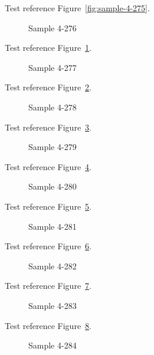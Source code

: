 Test reference Figure~\ref{fig:sample-4-275}.

\begin{figure}[tbhp]
\caption{Sample 4-276}
\label{fig:sample-4-276}
\end{figure}

Test reference Figure~\ref{fig:sample-4-276}.

\begin{figure}[tbhp]
\caption{Sample 4-277}
\label{fig:sample-4-277}
\end{figure}

Test reference Figure~\ref{fig:sample-4-277}.

\begin{figure}[tbhp]
\caption{Sample 4-278}
\label{fig:sample-4-278}
\end{figure}

Test reference Figure~\ref{fig:sample-4-278}.

\begin{figure}[tbhp]
\caption{Sample 4-279}
\label{fig:sample-4-279}
\end{figure}

Test reference Figure~\ref{fig:sample-4-279}.

\begin{figure}[tbhp]
\caption{Sample 4-280}
\label{fig:sample-4-280}
\end{figure}

Test reference Figure~\ref{fig:sample-4-280}.

\begin{figure}[tbhp]
\caption{Sample 4-281}
\label{fig:sample-4-281}
\end{figure}

Test reference Figure~\ref{fig:sample-4-281}.

\begin{figure}[tbhp]
\caption{Sample 4-282}
\label{fig:sample-4-282}
\end{figure}

Test reference Figure~\ref{fig:sample-4-282}.

\begin{figure}[tbhp]
\caption{Sample 4-283}
\label{fig:sample-4-283}
\end{figure}

Test reference Figure~\ref{fig:sample-4-283}.

\begin{figure}[tbhp]
\caption{Sample 4-284}
\label{fig:sample-4-284}
\end{figure}


